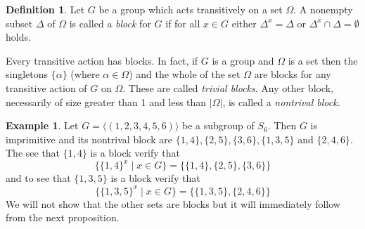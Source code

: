 \documentclass[]{article}
\theoremstyle{definition}
\newtheorem{defn}[thm]{Definition}
\newtheorem{example}[thm]{Example}
\begin{document}
\begin{defn} \label{defn:block}
	Let $G$ be a group which acts transitively on a set $\Omega$. A nonempty subset $\Delta$ of $\Omega$ is called a \emph{block} for $G$ if for all $x \in G$ either $\Delta^x = \Delta$ or $\Delta^x \cap \Delta = \emptyset$ holds.
\end{defn}

Every transitive action has blocks. In fact, if $G$ is a group and $\Omega$ is a set then the singletons $\{\alpha \}$ (where $\alpha \in \Omega$) and the whole of the set $\Omega$ are blocks for any transitive action of $G$ on $\Omega$. These are called \emph{trivial blocks}. Any other block, necessarily of size greater than 1 and less than $|\Omega|$, is called a \emph{nontrival block}.

\begin{example} \label{example:blocks}
	Let $G = \langle (1,2,3,4,5,6) \rangle$ be a subgroup of $S_6$. Then $G$ is imprimitive and its nontrival block are $\{1,4\},\{2,5\},\{3,6\},\{1,3,5\}$ and $\{2,4,6\}$. The see that $\{1,4\}$ is a block verify that $$\{\{1,4\}^x \; | \; x \in G \} = \{\{1,4\},\{2,5\},\{3,6\}\}$$ and to see that $\{1,3,5\}$ is a block verify that  $$\{\{1,3,5\}^x \; | \; x \in G \}=\{\{1,3,5\},\{2,4,6\}\}$$
	We will not show that the other sets are blocks but it will immediately follow from the next proposition.
\end{example}
\end{document}
